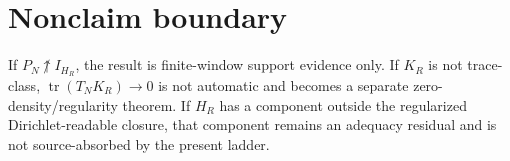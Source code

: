 \documentclass[11pt]{article}
\begin{document}
\section{Nonclaim boundary}
If $P_N\not\uparrow I_{H_R}$, the result is finite-window support evidence only.  If $K_R$ is not trace-class, $\operatorname{tr}(T_NK_R)\to0$ is not automatic and becomes a separate zero-density/regularity theorem.  If $H_R$ has a component outside the regularized Dirichlet-readable closure, that component remains an adequacy residual and is not source-absorbed by the present ladder.
\end{document}
